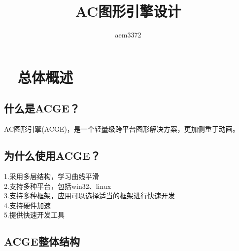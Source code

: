 \documentclass[12pt,a4paper]{report}
\title{\erhao AC图形引擎设计}
\author{aem3372}
\begin{document}
\maketitle
\chapter{　总体概述}
\section{什么是ACGE？}
AC图形引擎(ACGE)，是一个轻量级跨平台图形解决方案，更加侧重于动画。\\

\section{为什么使用ACGE？}
1.采用多层结构，学习曲线平滑\\
2.支持多种平台，包括win32、linux\\
3.支持多种框架，应用可以选择适当的框架进行快速开发\\
4.支持硬件加速\\
5.提供快速开发工具\\

\section{ACGE整体结构}
\begin{tikzpicture}[auto, scale=1,inner sep=3pt, minimum size=6mm]

\end{tikzpicture}\\
\end{document}
